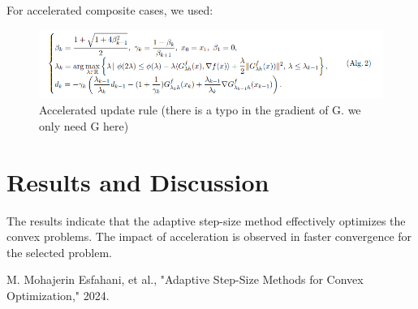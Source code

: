 \documentclass{article}
\begin{document}
For accelerated composite cases, we used:

\begin{figure}[htbp]
    \centering
    \includegraphics[width=1\textwidth]{image.png}
    \caption{Accelerated update rule (there is a typo in the gradient of G. we only need G here)}
\end{figure}

\section{Results and Discussion}
The results indicate that the adaptive step-size method effectively optimizes the convex problems. The impact of acceleration is observed in faster convergence for the selected problem.

\begin{thebibliography}{9}
     M. Mohajerin Esfahani, et al., "Adaptive Step-Size Methods for Convex Optimization," 2024.
\end{thebibliography}
\end{document}
